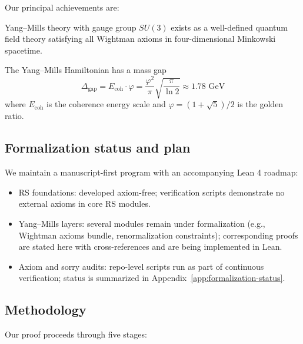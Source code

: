 \documentclass[11pt]{amsart}
\newcommand{\Ecoh}{E_{\text{coh}}}
\newcommand{\massGap}{\Delta_{\text{gap}}}
\begin{document}
Our principal achievements are:

\begin{theorem} \label{thm:existence}
Yang--Mills theory with gauge group $SU(3)$ exists as a well-defined quantum field theory satisfying all Wightman axioms in four-dimensional Minkowski spacetime.
\end{theorem}

\begin{theorem} \label{thm:mass_gap}
The Yang--Mills Hamiltonian has a mass gap
\begin{equation}
\massGap = \Ecoh \cdot \varphi = \frac{\varphi^2}{\pi} \sqrt{\frac{\pi}{\ln 2}} \approx 1.78 \text{ GeV}
\end{equation}
where $\Ecoh$ is the coherence energy scale and $\varphi = (1+\sqrt{5})/2$ is the golden ratio.
\end{theorem}

\subsection{Formalization status and plan}
We maintain a manuscript-first program with an accompanying Lean 4 roadmap:
\begin{itemize}
\item RS foundations: developed axiom-free; verification scripts demonstrate no external axioms in core RS modules.
\item Yang--Mills layers: several modules remain under formalization (e.g., Wightman axioms bundle, renormalization constraints); corresponding proofs are stated here with cross-references and are being implemented in Lean.
\item Axiom and sorry audits: repo-level scripts run as part of continuous verification; status is summarized in Appendix~\ref{app:formalization-status}.
\end{itemize}

\subsection{Methodology}

Our proof proceeds through five stages:
\end{document}
